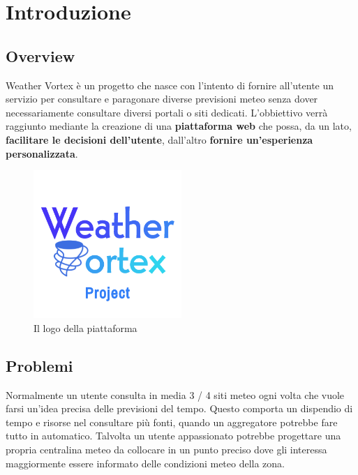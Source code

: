 

\chapter{Introduzione}


\section{Overview}
Weather Vortex è un progetto che nasce con l'intento di fornire all'utente un servizio per consultare e paragonare diverse previsioni meteo senza dover necessariamente consultare diversi portali o siti dedicati. L'obbiettivo verrà raggiunto mediante la creazione di una \textbf{piattaforma web} che possa, da un lato, \textbf{facilitare le decisioni dell'utente}, dall'altro \textbf{fornire un'esperienza personalizzata}.

\begin{figure}[H]
    \caption{Il logo della piattaforma}
    \label{fig:Logo}
    \centering
    \includegraphics[width=0.5\textwidth]{Images/logo.png}
\end{figure}

\section{Problemi}
Normalmente un utente consulta in media 3 / 4 siti meteo ogni volta che vuole farsi un'idea precisa delle previsioni del tempo. Questo comporta un dispendio di tempo e risorse nel consultare più fonti, quando un aggregatore potrebbe fare tutto in automatico. Talvolta un utente appassionato potrebbe progettare una propria centralina meteo da collocare in un punto preciso dove gli interessa maggiormente essere informato delle condizioni meteo della zona.

